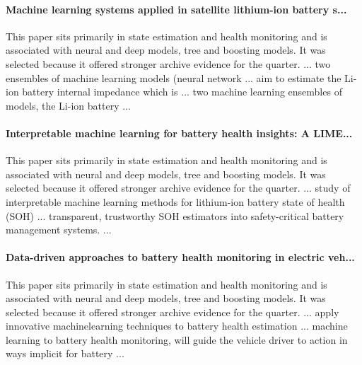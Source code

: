 \documentclass[conference]{IEEEtran}
\begin{document}
\paragraph{Machine learning systems applied in satellite lithium-ion battery s...} This paper sits primarily in state estimation and health monitoring and is associated with neural and deep models, tree and boosting models. It was selected because it offered stronger archive evidence for the quarter. ... two ensembles of machine learning models (neural network ... aim to estimate the Li-ion battery internal impedance which is ... two machine learning ensembles of models, the Li-ion battery ... \cite{machinelearningsystems2018}

\paragraph{Interpretable machine learning for battery health insights: A LIME...} This paper sits primarily in state estimation and health monitoring and is associated with neural and deep models, tree and boosting models. It was selected because it offered stronger archive evidence for the quarter. ... study of interpretable machine learning methods for lithium-ion battery state of health (SOH) ... transparent, trustworthy SOH estimators into safety-critical battery management systems. ... \cite{interpretablemachinelear2025}

\paragraph{Data-driven approaches to battery health monitoring in electric veh...} This paper sits primarily in state estimation and health monitoring and is associated with neural and deep models, tree and boosting models. It was selected because it offered stronger archive evidence for the quarter. ... apply innovative machinelearning techniques to battery health estimation ... machine learning to battery health monitoring, will guide the vehicle driver to action in ways implicit for battery ... \cite{datadrivenapproaches2024}
\end{document}
